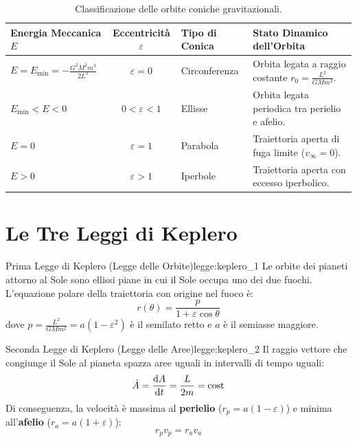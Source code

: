 \begin{table}[htbp]
\centering
\caption{Classificazione delle orbite coniche gravitazionali.}
\label{tab:orbite_coniche}
\begin{tabularx}{\textwidth}{p{4.2cm} c p{2.5cm} X}
\toprule
\textbf{Energia Meccanica $E$} & \textbf{Eccentricità $\varepsilon$} & \textbf{Tipo di Conica} & \textbf{Stato Dinamico dell'Orbita} \\
\midrule
$E = E_{\min} = -\frac{G^2 M^2 m^3}{2 L^2}$ & $\varepsilon = 0$ & Circonferenza & Orbita legata a raggio costante $r_0 = \frac{L^2}{G M m^2}$. \\
$E_{\min} < E < 0$ & $0 < \varepsilon < 1$ & Ellisse & Orbita legata periodica tra perielio e afelio. \\
$E = 0$ & $\varepsilon = 1$ & Parabola & Traiettoria aperta di fuga limite ($v_\infty = 0$). \\
$E > 0$ & $\varepsilon > 1$ & Iperbole & Traiettoria aperta con eccesso iperbolico. \\
\bottomrule
\end{tabularx}
\end{table}

\section{Le Tre Leggi di Keplero}
\label{sec:leggi_keplero}

\begin{legge}{Prima Legge di Keplero (Legge delle Orbite)}{legge:keplero_1}
Le orbite dei pianeti attorno al Sole sono ellissi piane in cui il Sole occupa uno dei due fuochi. L'equazione polare della traiettoria con origine nel fuoco è:
\begin{equation}
    r(\theta) = \frac{p}{1 + \varepsilon \cos\theta}
    \label{eq:orbita_polare}
\end{equation}
dove $p = \frac{L^2}{G M m^2} = a(1 - \varepsilon^2)$ è il semilato retto e $a$ è il semiasse maggiore.
\end{legge}

\begin{legge}{Seconda Legge di Keplero (Legge delle Aree)}{legge:keplero_2}
Il raggio vettore che congiunge il Sole al pianeta spazza aree uguali in intervalli di tempo uguali:
\begin{equation}
    \dot{A} = \frac{\mathrm{d} A}{\mathrm{d} t} = \frac{L}{2m} = \text{cost}
\end{equation}
Di conseguenza, la velocità è massima al \textbf{perielio} ($r_p = a(1-\varepsilon)$) e minima all'\textbf{afelio} ($r_a = a(1+\varepsilon)$):
\begin{equation}
    r_p v_p = r_a v_a
\end{equation}
\end{legge}

